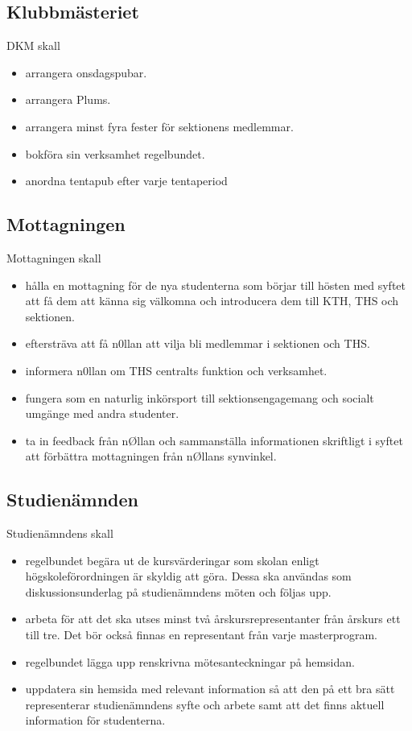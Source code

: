 \documentclass{dgovdoc}
\begin{document}
\subsection{Klubbmästeriet}

DKM skall

\begin{itemize}
\item arrangera onsdagspubar.
\item arrangera Plums.
\item arrangera minst fyra fester för sektionens medlemmar.
\item bokföra sin verksamhet regelbundet.
\item anordna tentapub efter varje tentaperiod
\end{itemize}

\subsection{Mottagningen}

Mottagningen skall

\begin{itemize}
\item hålla en mottagning för de nya studenterna som börjar till hösten med
  syftet att få dem att känna sig välkomna och introducera dem till KTH,
  THS och sektionen.
\item eftersträva att få n0llan att vilja bli medlemmar i sektionen och THS.
\item informera n0llan om THS centralts funktion och verksamhet.
\item fungera som en naturlig inkörsport till sektionsengagemang och socialt
  umgänge med andra studenter.
\item ta in feedback från nØllan och sammanställa informationen skriftligt i
  syftet att förbättra mottagningen från nØllans synvinkel.
\end{itemize}

\subsection{Studienämnden}

Studienämndens skall

\begin{itemize}
\item regelbundet begära ut de kursvärderingar som skolan enligt
  högskoleförordningen är skyldig att göra. Dessa ska användas som
  diskussionsunderlag på studienämndens möten och följas upp.
\item arbeta för att det ska utses minst två årskursrepresentanter från årskurs
  ett till tre. Det bör också finnas en representant från varje masterprogram.
\item regelbundet lägga upp renskrivna mötesanteckningar på hemsidan.
\item uppdatera sin hemsida med relevant information så att den på ett bra sätt
  representerar studienämndens syfte och arbete samt att det finns aktuell
  information för studenterna.
\end{itemize}
\end{document}
